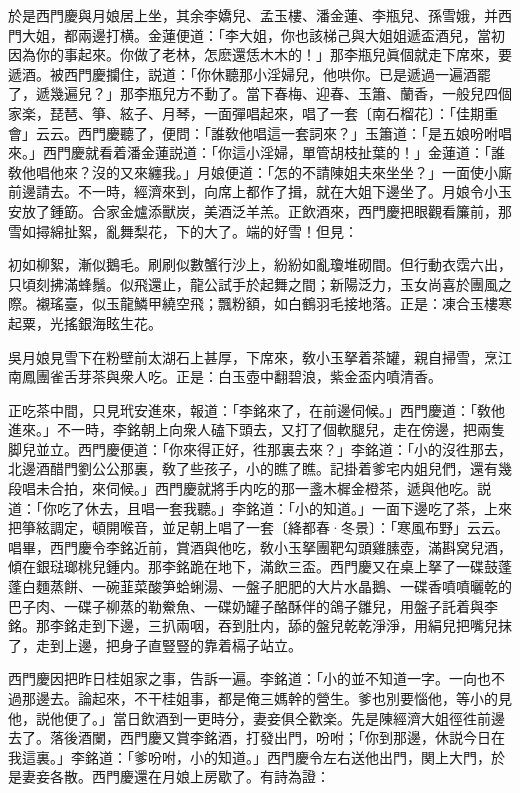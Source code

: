 於是西門慶與月娘居上坐，其余李嬌兒、孟玉樓、潘金蓮、李瓶兒、孫雪娥，并西門大姐，都兩邊打横。金蓮便道：「李大姐，你也該梯己與大姐姐遞盃酒兒，當初因為你的事起來。你做了老林，怎麽還恁木木的！」那李瓶兒眞個就走下席來，要遞酒。被西門慶攔住，説道：「你休聽那小淫婦兒，他哄你。已是遞過一遍酒罷了，遞幾遍兒？」那李瓶兒方不動了。當下春梅、迎春、玉簫、蘭香，一般兒四個家楽，琵琶、箏、絃子、月琴，一面彈唱起來，唱了一套〔南石榴花〕：「佳期重會」云云。西門慶聽了，便問：「誰敎他唱這一套詞來？」玉簫道：「是五娘吩咐唱來。」西門慶就看着潘金蓮説道：「你這小淫婦，單管胡枝扯葉的！」金蓮道：「誰敎他唱他來？沒的又來纏我。」月娘便道：「怎的不請陳姐夫來坐坐？」一面使小廝前邊請去。不一時，經濟來到，向席上都作了揖，就在大姐下邊坐了。月娘令小玉安放了鍾筯。合家金爐添獸炭，美酒泛羊羔。正飲酒來，西門慶把眼觀看簾前，那雪如撏綿扯絮，亂舞梨花，下的大了。端的好雪！但見：

\begin{myquote}
初如柳絮，漸似鵝毛。刷刷似數蟹行沙上，紛紛如亂瓊堆砌間。但行動衣霑六出，只頃刻拂滿蜂鬚。似飛還止，龍公試手於起舞之間；新陽泛力，玉女尚喜於團風之際。襯瑤臺，似玉龍鱗甲繞空飛；飄粉額，如白鶴羽毛接地落。正是：凍合玉樓寒起粟，光搖銀海眩生花。
\end{myquote}

吳月娘見雪下在粉壁前太湖石上甚厚，下席來，敎小玉拏着茶罐，親自掃雪，烹江南鳳團雀舌芽茶與衆人吃。正是：白玉壺中翻碧浪，紫金盃内噴清香。

正吃茶中間，只見玳安進來，報道：「李銘來了，在前邊伺候。」西門慶道：「敎他進來。」不一時，李銘朝上向衆人磕下頭去，又打了個軟腿兒，走在傍邊，把兩隻脚兒並立。西門慶便道：「你來得正好，徃那裏去來？」李銘道：「小的沒徃那去，北邊酒醋門劉公公那裏，敎了些孩子，小的瞧了瞧。記掛着爹宅内姐兒們，還有幾段唱未合拍，來伺候。」西門慶就將手内吃的那一盞木樨金橙茶，遞與他吃。説道：「你吃了休去，且唱一套我聽。」李銘道：「小的知道。」一面下邊吃了茶，上來把箏絃調定，頓開喉音，並足朝上唱了一套〔絳都春·冬景〕：「寒風布野」云云。　唱畢，西門慶令李銘近前，賞酒與他吃，敎小玉拏團靶勾頭雞膆壺，滿斟窝兒酒，傾在銀琺瑯桃兒鍾内。那李銘跪在地下，滿飲三盃。西門慶又在桌上拏了一碟鼓蓬蓬白麵蒸餅、一碗韮菜酸笋蛤蜊湯、一盤子肥肥的大片水晶鵝、一碟香噴噴曬乾的巴子肉、一碟子柳蒸的勒鮝魚、一碟奶罐子酪酥伴的鴿子雛兒，用盤子託着與李銘。那李銘走到下邊，三扒兩咽，吞到肚内，舔的盤兒乾乾淨淨，用絹兒把嘴兒抹了，走到上邊，把身子直豎豎的靠着槅子站立。

西門慶因把昨日桂姐家之事，告訴一遍。李銘道：「小的並不知道一字。一向也不過那邊去。論起來，不干桂姐事，都是俺三媽幹的營生。爹也別要惱他，等小的見他，説他便了。」當日飲酒到一更時分，妻妾俱仝歡楽。先是陳經濟大姐徑徃前邊去了。落後酒闌，西門慶又賞李銘酒，打發出門，吩咐；「你到那邊，休説今日在我這裏。」李銘道：「爹吩咐，小的知道。」西門慶令左右送他出門，関上大門，於是妻妾各散。西門慶還在月娘上房歇了。有詩為證：

